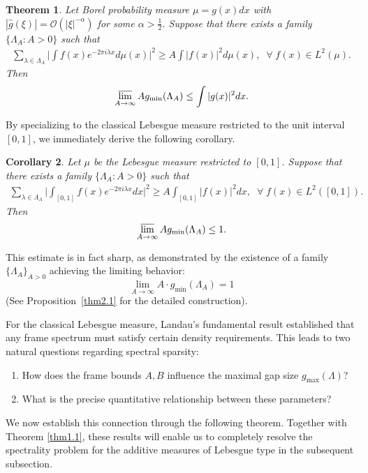 \documentclass[12pt,psfig,reqno]{amsart}
\numberwithin{equation}{section}
\theoremstyle{plain}
\newtheorem{thm}{Theorem}[section]
\newtheorem{cor}[thm]{Corollary}
\begin{document}
\begin{thm}\label{thm1.3}
	Let Borel probability measure $\mu=g(x)dx$ with $|\widehat{g}(\xi)|=\mathcal{O}(|\xi|^{-\alpha})$ for some $\alpha>\frac12$. 
	Suppose that there exists a family  $\{\Lambda_A:A>0\}$ such that 
	\begin{align*}
		\sum_{\lambda\in\Lambda_A}\Big|\int f(x)e^{-2\pi i\lambda x}d\mu(x)\Big|^2\geq A\int |f(x)|^2d\mu(x),\;\;\forall\;f(x)\in L^2(\mu).
	\end{align*}
Then 
	\[	 \varlimsup_{A\rightarrow\infty}A g_{\min}(\Lambda_A)\leq	\int |g(x)|^2dx. \] 
\end{thm}
By specializing to the classical Lebesgue measure restricted to the unit interval $[0,1]$, we immediately derive the following corollary.  
\begin{cor}\label{thm1.4}
	Let $\mu$ be the Lebesgue measure restricted to $[0,1]$. 
		Suppose that there exists a family  $\{\Lambda_A:A>0\}$ such that 
	\begin{align*}
		\sum_{\lambda\in\Lambda_A}\Big|\int_{[0,1]} f(x)e^{-2\pi i\lambda x}dx\Big|^2\geq A\int_{[0,1]} |f(x)|^2dx,\;\;\forall\;f(x)\in L^2([0,1]).
	\end{align*}
	Then 
	\[	 \varlimsup_{A\rightarrow\infty}A g_{\min}(\Lambda_A)\leq	1. \] 
\end{cor}
This estimate is in fact sharp, as demonstrated by the existence of a family $\{\Lambda_A\}_{A>0}$ achieving the limiting behavior:
\[
\lim_{A\to\infty} A\cdot g_{\min}(\Lambda_A) = 1
\]
(See Proposition~\ref{thm2.1} for the detailed construction).

For the classical Lebesgue measure, Landau's fundamental result \cite{Lan67} established that any frame spectrum must satisfy certain density requirements. This leads to two natural questions regarding spectral sparsity:
\begin{enumerate}
	\item How does the frame bounds $A,B$ influence the maximal gap size $g_{\max}(\Lambda)$?
	\item What is the precise quantitative relationship between these parameters?
\end{enumerate}
We now establish this connection through the following theorem. Together with Theorem \ref{thm1.1}, these results will enable us to completely resolve the spectrality problem for the additive measures of Lebesgue type in the subsequent subsection.
\end{document}
